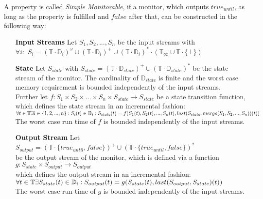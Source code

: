 		\begin{definition}
			A property is called \textit{Simple Monitorable}, if a monitor, which outputs $true_{until}$, as long as the property is fulfilled and $false$ after that, can be constructed in the following way:
			\begin{itemize}
				\item[\textbf{Input Streams}]
					Let $S_1, S_2, ..., S_n$ be the input streams with\\
					$\forall i:$ $S_i=(\mathbb{T}\cdot \mathbb{D}_i)^\omega\cup(\mathbb{T}\cdot \mathbb{D}_i)^+\cup(\mathbb{T}\cdot \mathbb{D}_i)^*\cdot(\mathbb{T}_\infty\cup\mathbb{T}\cdot\{\bot\})$
				\item[\textbf{State}]
					Let $S_{state}$ with $S_{state}= (\mathbb{T}\cdot \mathbb{D}_{state})^+\cup(\mathbb{T}\cdot \mathbb{D}_{state})^*$ be the state stream of the monitor. The cardinality of $\mathbb{D}_{state}$ is finite and the worst case memory requirement is bounded independently of the input streams.\\
					Further let $f: S_1 \times S_2 \times ... \times S_n \times S_{state}\rightarrow S_{state}$ be a state transition function, which defines the state stream in an incremental fashion:\\
					\begin{math}
						\forall t\in \mathbb T \exists i\in \{1,2,...,n\}: S_i(t)\in\mathbb D_i:\\
						S_{state}(t)= f(S_1(t), S_2(t), ..., S_n(t), last(S_{state}, merge(S_1, S_2, ..., S_n))(t))
					\end{math}\\
					The worst case run time of $f$ is bounded independently of the input streams.
				\item[\textbf{Output Stream}]
					Let $S_{output}= (\mathbb{T}\cdot \{true_{until}, false\})^+\cup(\mathbb{T}\cdot \{true_{until}, false\})^*$\\
					be the output stream of the monitor, which is defined via a function\\
					$g:S_{state}\times S_{output}\rightarrow S_{output}$\\
					which defines the output stream in an incremental fashion:\\
					\begin{math}
						\forall t\in \mathbb T \exists S_{state}(t)\in\mathbb D_i:\\
						S_{output}(t)= g(S_{state}(t), last(S_{output}, S_{state})(t))
					\end{math}\\
					The worst case run time of $g$ is bounded independently of the input streams.
			\end{itemize}
		\end{definition}
